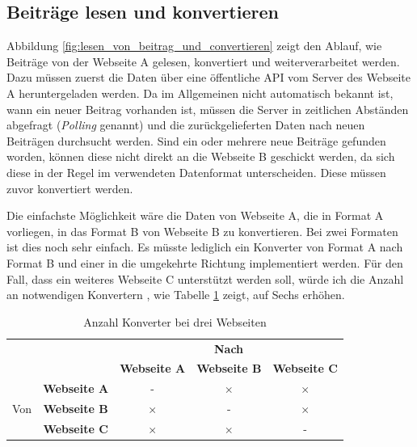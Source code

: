 \subsection{Beiträge lesen und konvertieren} %
\label{sub:beiträge_lesen_und_konvertieren}

Abbildung \ref{fig:lesen_von_beitrag_und_convertieren} zeigt den Ablauf, wie Beiträge von der Webseite A gelesen, konvertiert und weiterverarbeitet werden. Dazu müssen zuerst die Daten über eine öffentliche API vom Server des Webseite A heruntergeladen werden. Da im Allgemeinen nicht automatisch bekannt ist, wann ein neuer Beitrag vorhanden ist, müssen die Server in zeitlichen Abständen abgefragt (\emph{Polling} genannt) und die zurückgelieferten Daten nach neuen Beiträgen durchsucht werden. Sind ein oder mehrere neue Beiträge gefunden worden, können diese nicht direkt an die Webseite B geschickt werden, da sich diese in der Regel im verwendeten Datenformat unterscheiden. Diese müssen zuvor konvertiert werden.

Die einfachste Möglichkeit wäre die Daten von Webseite A, die in Format A vorliegen, in das Format B von Webseite B zu konvertieren. Bei zwei Formaten ist dies noch sehr einfach. Es müsste lediglich ein Konverter von Format A nach Format B und einer in die umgekehrte Richtung implementiert werden. Für den Fall, dass ein weiteres Webseite C unterstützt werden soll, würde ich die Anzahl an notwendigen Konvertern , wie Tabelle \ref{tbl:anzahl_konvertern_bei_drei_netzwerken} zeigt, auf Sechs erhöhen. 

\begin{table}[ht]
    \centering
    \caption{Anzahl Konverter bei drei Webseiten}
    
    \begin{tabular}{c|c|c|c|c}
        \multicolumn{2}{c|}{\multirow{2}{*}{}} & 
        \multicolumn{3}{|c}{\textbf{Nach}}   \\ 
        \cline{3-5} 

        \multicolumn{2}{c|}{} & 
        \textbf{Webseite A} & 
        \textbf{Webseite B} & 
        \textbf{Webseite C} \\ 
        \hline

        \multirow{3}{*}{Von} & 
        \textbf{Webseite A} & 
        -&            
        $ \times $ &            
        $ \times $ \\ 
        \cline{2-5} 

        & 
        \textbf{Webseite B} &            
        $ \times $ &            
        -&            
        $ \times $ \\ 
        \cline{2-5} 
         
        & 
        \textbf{Webseite C} &            
        $ \times $ &            
        $ \times $ &            
        -\\
    \end{tabular}
    \label{tbl:anzahl_konvertern_bei_drei_netzwerken}
\end{table}

